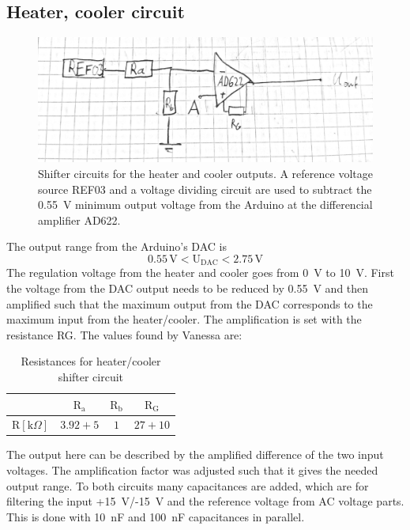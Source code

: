 \documentclass[12pt]{scrartcl}
\begin{document}
    \subsection{Heater, cooler circuit}
      \begin{figure}[H]
        \includegraphics[width = \textwidth]{circ2.png}
        \caption{Shifter circuits for the heater and cooler outputs. A reference
        voltage source REF03 and a voltage dividing circuit are used to subtract
        the 0.55~V minimum output voltage from the Arduino at the differencial
        amplifier AD622.}
        \label{fig3}
      \end{figure}
      The output range from the Arduino's DAC is $$0.55\, \text{V} <
      \text{U}_{\text{DAC}} < 2.75\, \text{V}$$
      The regulation voltage from the heater and cooler goes from 0~V to 10~V. First the
      voltage from the DAC output needs to be reduced by 0.55~V and then amplified
      such that the maximum output from the DAC corresponds to the maximum input from
      the heater/cooler. The amplification is set with the resistance RG.
      The values found by Vanessa are: \\
      \begin{table}[H] \label{hcres}
        \begin{tabular}{l|c c c}
          & $\text{R}_\text{a}$ & $\text{R}_\text{b}$ & $\text{R}_\text{G}$ \\
          \hline\vspace{5pt}
          $\text{R}[\text{k}\Omega]$ & $3.92 + 5$ & $1$ & $27+10$
        \end{tabular}
        \flushleft \caption{Resistances for heater/cooler shifter circuit}
      \end{table}
      \noindent The output here can be described by the amplified difference of the two
      input voltages. The amplification factor was adjusted such that it gives
      the needed output range.
      To both circuits many capacitances are added, which are for filtering
      the input +15~V/-15~V and the reference voltage from AC voltage parts. This is done with
      10~nF and 100~nF capacitances in parallel.
\end{document}
